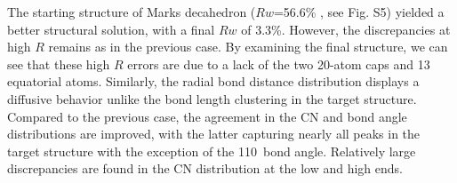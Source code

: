 The starting structure of Marks decahedron ($Rw$=56.6\% , see Fig. S5) yielded a better structural solution, with a final $Rw$ of 3.3\%.
However, the discrepancies at high $R$ remains as in the previous case. By examining the final structure, we can see that these high $R$ errors are due to a lack of the two 20-atom caps and 13 equatorial atoms. Similarly, the radial bond distance distribution displays a diffusive behavior unlike the bond length clustering in the target structure.
Compared to the previous case, the agreement in the CN and bond angle distributions are improved, with the latter  capturing nearly all peaks in the target structure with the exception of the 110\degree ~bond angle.
Relatively large discrepancies are found in the CN distribution at the low and high ends.
